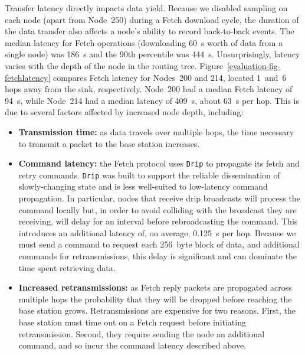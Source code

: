 Transfer latency directly impacts data yield. Because we disabled sampling on
each node (apart from Node~250) during a Fetch download cycle, the duration
of the data transfer also affects a node's ability to record back-to-back
events. The median latency for Fetch operations (downloading 60~s worth of
data from a single node) was 186~s and the 90th percentile was 444~s.
Unsurprisingly, latency varies with the depth of the node in the routing
tree. Figure~\ref{evaluation-fig-fetchlatency} compares Fetch latency for
Nodes~200 and 214, located 1~and~6 hops away from the sink, respectively.
Node~200 had a median Fetch latency of 94~s, while Node~214 had a median
latency of 409~s, about 63~s per hop. This is due to several factors affected
by increased node depth, including:

\begin{itemize}

\item \textbf{Transmission time:} as data travels over multiple hops, the
time necessary to transmit a packet to the base station increases.

\item \textbf{Command latency:} the Fetch protocol uses \texttt{Drip} to
propagate its fetch and retry commands. \texttt{Drip} was built to support
the reliable dissemination of slowly-changing state and is less well-suited
to low-latency command propagation. In particular, nodes that receive drip
broadcasts will process the command locally but, in order to avoid colliding
with the broadcast they are receiving, will delay for an interval before
rebroadcasting the command. This introduces an additional latency of, on
average, 0.125~s per hop. Because we must send a command to request each
256~byte block of data, and additional commands for retransmissions, this
delay is significant and can dominate the time spent retrieving data.

\item \textbf{Increased retransmissions:} as Fetch reply packets are
propagated across multiple hops the probability that they will be dropped
before reaching the base station grows. Retransmissions are expensive for two
reasons. First, the base station must time out on a Fetch request before
initiating retransmission. Second, they require sending the node an
additional command, and so incur the command latency described above.

\end{itemize}
